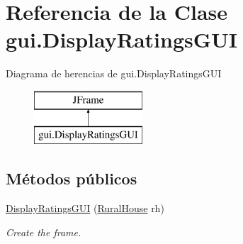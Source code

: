 \hypertarget{classgui_1_1_display_ratings_g_u_i}{}\section{Referencia de la Clase gui.\+Display\+Ratings\+G\+UI}
\label{classgui_1_1_display_ratings_g_u_i}
Diagrama de herencias de gui.\+Display\+Ratings\+G\+UI\begin{figure}[H]
\begin{center}
\leavevmode
\includegraphics[height=2.000000cm]{classgui_1_1_display_ratings_g_u_i}
\end{center}
\end{figure}
\subsection*{Métodos públicos}
\begin{DoxyCompactItemize}
\item 
\mbox{\hyperlink{classgui_1_1_display_ratings_g_u_i_a5cd86dd9480c8d64c1d2865a8c4e3af5}{Display\+Ratings\+G\+UI}} (\mbox{\hyperlink{classdomain_1_1_rural_house}{Rural\+House}} rh)
\begin{DoxyCompactList}\small\item\em Create the frame. \end{DoxyCompactList}\end{DoxyCompactItemize}

